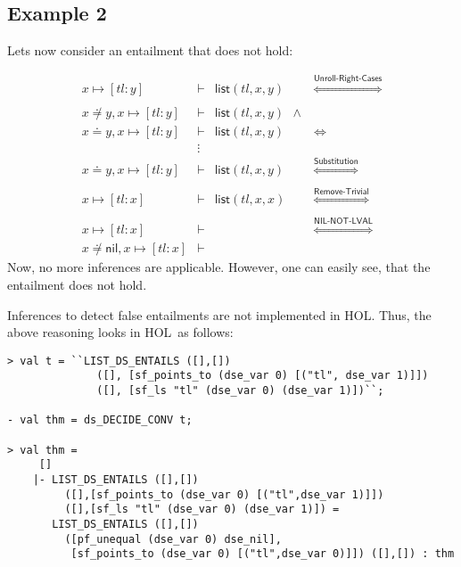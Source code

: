 \documentclass{scrartcl}
\theoremstyle{definition}
\newcommand{\HOL}{{\textsc{HOL}}}
\newcommand{\nil}{{\textsf{nil}}}
\newcommand{\pfequal}[2]{\ensuremath{#1 \doteq #2}}
\newcommand{\pfunequal}[2]{\ensuremath{#1 \not\doteq #2}}
\newcommand{\sfpointsto}[2]{#1 \mapsto [#2]}
\newcommand{\sflist}{{\textsf{list}}}
\begin{document}
\subsection{Example 2}

Lets now consider an entailment that does not hold:


\[\begin{array}{lllc}
\sfpointsto {x} {\textit{tl}:y} & \vdash & \sflist(\textit{tl},x,y) &
\stackrel{\textsf{Unroll-Right-Cases}}{\Longleftrightarrow} \\
\\
\pfunequal {x} {y},\sfpointsto {x} {\textit{tl}:y} & \vdash &
  \sflist(\textit{tl},x,y)\ \ \wedge  \\
\pfequal x y,\sfpointsto {x} {\textit{tl}:y} & \vdash &
  \sflist(\textit{tl},x,y) & {\Longleftrightarrow}
\\
& \vdots \\
\pfequal x y,\sfpointsto {x} {\textit{tl}:y} & \vdash &
  \sflist(\textit{tl},x,y) & {\stackrel{\textsf{Substitution}}{\Longleftrightarrow}} \\ \\
\sfpointsto {x} {\textit{tl}:x} & \vdash & \sflist(\textit{tl},x,x) & {\stackrel{\textsf{Remove-Trivial}}{\Longleftrightarrow}} \\ \\
\sfpointsto {x} {\textit{tl}:x} & \vdash & & {\stackrel{\textsf{NIL-NOT-LVAL}}{\Longleftrightarrow}}\\
\pfunequal x \nil, \sfpointsto {x} {\textit{tl}:x} & \vdash &
\end{array}
\]
%
Now, no more inferences are applicable. However, one can easily see, that the
entailment does not hold.

Inferences to detect false entailments are not implemented in \HOL.
Thus, the above reasoning looks in \HOL\ as follows:
\begin{verbatim}
> val t = ``LIST_DS_ENTAILS ([],[])
              ([], [sf_points_to (dse_var 0) [("tl", dse_var 1)]])
              ([], [sf_ls "tl" (dse_var 0) (dse_var 1)])``;

- val thm = ds_DECIDE_CONV t;

> val thm =
     []
    |- LIST_DS_ENTAILS ([],[])
         ([],[sf_points_to (dse_var 0) [("tl",dse_var 1)]])
         ([],[sf_ls "tl" (dse_var 0) (dse_var 1)]) =
       LIST_DS_ENTAILS ([],[])
         ([pf_unequal (dse_var 0) dse_nil],
          [sf_points_to (dse_var 0) [("tl",dse_var 0)]]) ([],[]) : thm
\end{verbatim}
\end{document}
